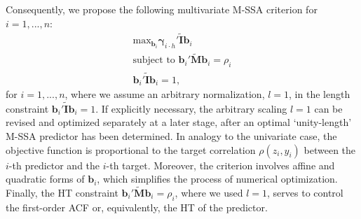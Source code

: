 \documentclass[11pt,a4paper]{article}
\begin{document}
Consequently, we propose the following multivariate M-SSA criterion for $i=1,...,n$: 
\begin{eqnarray}\label{mcrit1}
\textrm{max}_{\mathbf{b}_i}\boldsymbol{\gamma}_{i\cdot h}'\tilde{\mathbf{I}}\mathbf{b}_{i}\\
\textrm{subject~to~}\mathbf{b}_{i}'\tilde{\mathbf{M}}\mathbf{b}_{i}=\rho_i\nonumber\\
\mathbf{b}_{i}'\tilde{\mathbf{I}}\mathbf{b}_{i}=1,\nonumber
\end{eqnarray}
for $i=1,...,n$, where we assume an arbitrary normalization, $l=1$, in the length constraint $\mathbf{b}_{i}'\tilde{\mathbf{I}}\mathbf{b}_{i}=1$. If explicitly necessary, the arbitrary scaling $l=1$ can be revised and optimized separately at a later stage, after an optimal `unity-length' M-SSA predictor has been determined. In analogy to the univariate case, the objective function is proportional to the target correlation $\rho(z_i,y_i)$ between the $i$-th predictor and the $i$-th target.  Moreover, the criterion involves affine and quadratic forms of $\mathbf{b}_i$, which simplifies the process of numerical optimization. Finally, the HT constraint $\mathbf{b}_{i}'\tilde{\mathbf{M}}\mathbf{b}_{i}=\rho_i$, where we used $l=1$, serves to control the first-order ACF or, equivalently, the HT of the predictor.  \\
\end{document}
